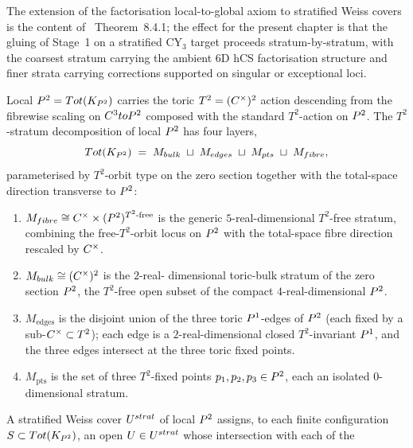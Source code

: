 The extension of the factorisation local-to-global axiom to stratified
Weiss covers is the content of \cite{CostelloGwilliam2017}~Theorem~8.4.1;
the effect for the present chapter is that the gluing of Stage~1 on a
stratified CY$_3$ target proceeds stratum-by-stratum, with the
coarsest stratum carrying the ambient 6D hCS factorisation structure
and finer strata carrying corrections supported on singular or
exceptional loci.

\begin{example}
\label{ex:local-p2-stratified-weiss}
Local $P^2 = Tot(K_{P^2})$ carries the toric $T^2 = (C^\times)^2$
action descending from the fibrewise scaling on $C^3 to P^2$
composed with the standard $T^2$-action on $P^2$. The $T^2$-stratum
decomposition of local $P^2$ has four layers,
\begin{equation}
\label{eq:local-p2-toric-strata}
  Tot(K_{P^2}) \;=\;
  M_{bulk} \;\sqcup\; M_{edges}
  \;\sqcup\; M_{pts} \;\sqcup\; M_{fibre},
\end{equation}
parameterised by $T^2$-orbit type on the zero section together with
the total-space direction transverse to $P^2$:
\begin{enumerate}
\item[(i)] $M_{fibre} \cong C^\times \times (P^2)^{T^2\text{-free}}$
is the generic $5$-real-dimensional $T^2$-free stratum, combining the
free-$T^2$-orbit locus on $P^2$ with the total-space fibre direction
rescaled by $C^\times$.
\item[(ii)] $M_{bulk} \cong (C^\times)^2$ is the $2$-real-
dimensional toric-bulk stratum of the zero section $P^2$, the
$T^2$-free open subset of the compact $4$-real-dimensional $P^2$.
\item[(iii)] $M_{\mathrm{edges}}$ is the disjoint union of the three
toric $P^1$-edges of $P^2$ (each fixed by a sub-$C^\times \subset
T^2$); each edge is a $2$-real-dimensional closed $T^2$-invariant
$P^1$, and the three edges intersect at the three toric fixed points.
\item[(iv)] $M_{\mathrm{pts}}$ is the set of three $T^2$-fixed points
$p_1, p_2, p_3 \in P^2$, each an isolated $0$-dimensional stratum.
\end{enumerate}
A stratified Weiss cover $U^{strat}$ of local $P^2$
assigns, to each finite configuration $S \subset Tot(K_{P^2})$, an
open $U \in U^{strat}$ whose intersection with each of the

\end{example}
